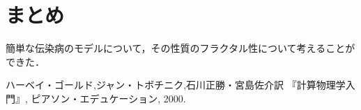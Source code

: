 \documentclass{jsarticle}
\begin{document}
    \section{まとめ}
        
        簡単な伝染病のモデルについて，その性質のフラクタル性について考えることができた．
        
    \begin{thebibliography}{99}
        ハーベイ・ゴールド,ジャン・トボチニク,石川正勝・宮島佐介訳 『計算物理学入門』, ピアソン・エデュケーション, 2000.
        
    \end{thebibliography}     
\end{document}
